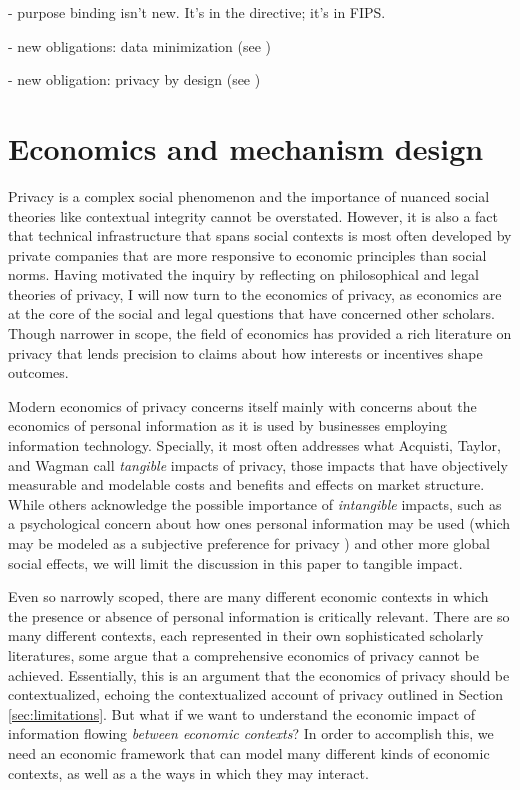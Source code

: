 \documentclass[../thesis.tex]{subfiles}
\begin{document}
- purpose binding isn't new. It's in the directive; it's in FIPS.

- new obligations: data minimization (see \cite{gurses2011engineering})

- new obligation: privacy by design (see \cite{danezis2015privacy})

\section{Economics and mechanism design}
\label{sec:economics}

Privacy is a complex social phenomenon and the
importance of nuanced social theories like
contextual integrity cannot be overstated.
However, it is also a fact that technical
infrastructure that spans social contexts
is most often developed by private companies that are more
responsive to economic principles than social norms.
Having motivated the inquiry by reflecting on
philosophical and legal theories of privacy,
I will now turn to the economics of privacy,
as economics are at the core of the social and
legal questions that have concerned other scholars.
Though narrower in scope, the field of economics
has provided a rich
literature on privacy that lends precision to
claims about how interests
or incentives shape outcomes.

Modern economics of privacy concerns itself mainly with
concerns about the economics of personal information
as it is used by businesses employing
information technology.
Specially, it most often addresses what Acquisti,
 Taylor, and Wagman \cite{acquisti2016economics} 
call \emph{tangible} impacts of privacy, those impacts that
have objectively measurable and modelable costs and
benefits and effects on market structure.
While others acknowledge the possible importance
of \emph{intangible} impacts, such as a psychological
concern about how ones personal information may be
used (which may be modeled as a subjective preference
for privacy \cite{calo2011boundaries} 
\cite{cofone2017dynamic}) and other more global
social effects, we will limit the discussion in this
paper to tangible impact.

Even so narrowly scoped, there are many different
economic contexts in which the presence or absence 
of personal information is critically relevant. 
There are so many different contexts, each represented
in their own sophisticated scholarly literatures,
some \cite{acquisti2016economics} argue that a comprehensive
economics of privacy cannot be achieved.
Essentially, this is an argument that the economics
of privacy should be contextualized, echoing
the contextualized account of privacy outlined
in Section \ref{sec:limitations}.
But what if we want to understand the economic impact of
information flowing \emph{between economic contexts}?
In order to accomplish this, we need an economic framework
that can model many different kinds of economic contexts,
as well as a the ways in which they may interact.
\end{document}
